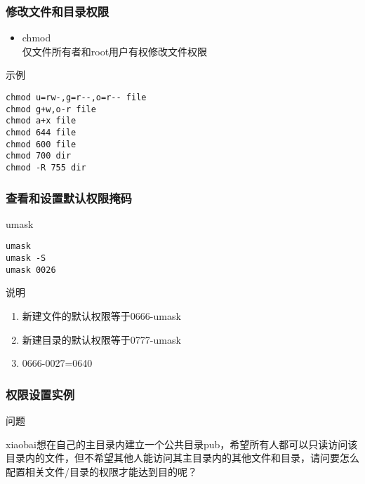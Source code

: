 \documentclass[xcolor=svgnames,presentation]{beamer}
\begin{document}
\begin{frame}[fragile]
\frametitle{修改文件和目录权限}
\label{sec-2-1-3}
\begin{itemize}

\item chmod\\
\label{sec-2-1-3-1}%
仅文件所有者和root用户有权修改文件权限
\end{itemize} %
\begin{exampleblock}{示例}
\label{sec-2-1-3-2}


\begin{verbatim}
chmod u=rw-,g=r--,o=r-- file
chmod g+w,o-r file
chmod a+x file
chmod 644 file
chmod 600 file
chmod 700 dir
chmod -R 755 dir
\end{verbatim}
\end{exampleblock}
\end{frame}
\begin{frame}[fragile]
\frametitle{查看和设置默认权限掩码}
\label{sec-2-1-4}
\begin{exampleblock}{umask}
\label{sec-2-1-4-1}


\begin{verbatim}
umask
umask -S
umask 0026
\end{verbatim}
\end{exampleblock}
\begin{block}{说明}
\label{sec-2-1-4-2}

\begin{enumerate}
\item 新建文件的默认权限等于0666-umask
\item 新建目录的默认权限等于0777-umask
\item 0666-0027=0640
\end{enumerate}
\end{block}
\end{frame}
\begin{frame}[fragile]
\frametitle{权限设置实例}
\label{sec-2-1-5}
\begin{block}{问题}
\label{sec-2-1-5-1}

xiaobai想在自己的主目录内建立一个公共目录pub，希望所有人都可以只读访问该目录内的文件，但不希望其他人能访问其主目录内的其他文件和目录，请问要怎么配置相关文件/目录的权限才能达到目的呢？
\end{block}
\end{frame}
\end{document}
